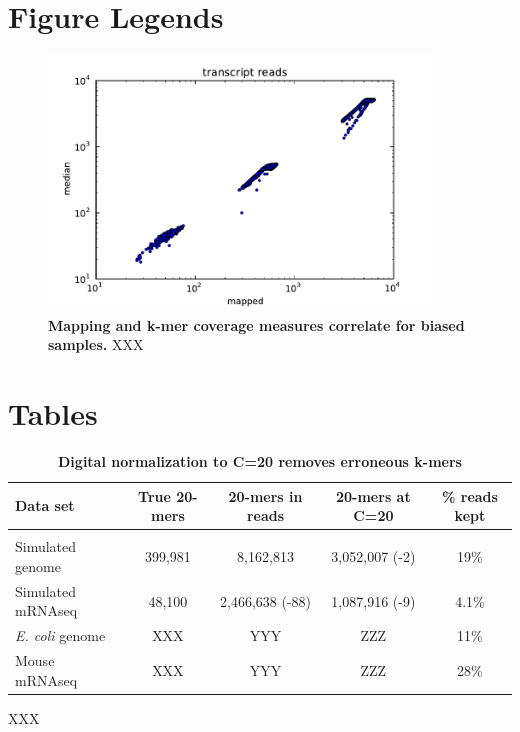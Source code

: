 \documentclass[10pt]{article}
\begin{document}
\section*{Figure Legends}
\begin{figure}[!ht]
\begin{center}
\includegraphics[width=4in]{diginorm-fig2a.pdf}
\end{center}
\caption{
{\bf Mapping and k-mer coverage measures correlate for biased samples.}
XXX
}
\label{fig:transcripts}
\end{figure}

\section*{Tables}

\begin{table}[!ht]
\caption{
\bf{Digital normalization to C=20 removes erroneous k-mers}}
\begin{tabular}{|l|c|c|c|c|}
Data set & True 20-mers & 20-mers in reads & 20-mers at C=20 & \% reads kept\\
\hline \\
Simulated genome & 399,981 & 8,162,813 & 3,052,007 (-2) & 19\% \\
Simulated mRNAseq & 48,100 & 2,466,638 (-88) & 1,087,916 (-9) & 4.1\% \\
{\em E. coli} genome & XXX & YYY & ZZZ & 11\% \\
Mouse mRNAseq & XXX & YYY & ZZZ & 28\% \\
\end{tabular}
\begin{flushleft} XXX
\end{flushleft}
\label{tab:normC20}
\end{table}
\end{document}
